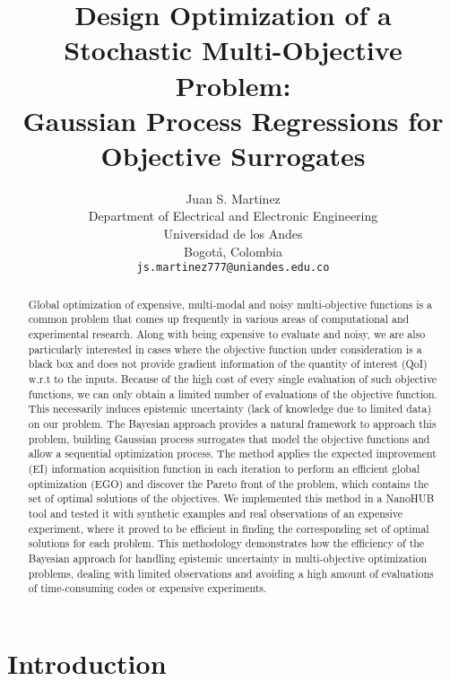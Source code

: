\documentclass{article}
\title{Design Optimization of a Stochastic Multi-Objective Problem: \\Gaussian Process Regressions for Objective Surrogates}
\author{
  Juan S. Martinez\\
  Department of Electrical and Electronic Engineering\\
  Universidad de los Andes\\
  Bogotá, Colombia \\
  \texttt{js.martinez777@uniandes.edu.co} \\
}
\begin{document}

\maketitle

\begin{abstract}
    Global optimization of expensive, multi-modal and noisy multi-objective functions is a common problem that comes up frequently in various areas of computational and experimental research. Along with being expensive to evaluate and noisy, we are also particularly interested in cases where the objective function under consideration is a black box and does not provide gradient information of the quantity of interest (QoI) w.r.t to the inputs. Because of the high cost of every single evaluation of such objective functions, we can only obtain a limited number of evaluations of the objective function. This necessarily induces epistemic uncertainty (lack of knowledge due to limited data) on our problem. The Bayesian approach provides a natural framework to approach this problem, building Gaussian process  surrogates that model the objective functions and allow a sequential optimization process. The method applies the expected improvement (EI) information acquisition function in each iteration to perform an efficient global optimization (EGO) and discover the Pareto front of the problem, which contains the set of optimal solutions of the objectives. We implemented this method in a NanoHUB tool and tested it with synthetic examples and real observations of an expensive experiment, where it proved to be efficient in finding the corresponding set of optimal solutions for each problem. This methodology demonstrates how the efficiency of the Bayesian approach for handling epistemic uncertainty in multi-objective optimization problems, dealing with limited observations and avoiding a high amount of evaluations of time-consuming codes or expensive experiments.
\end{abstract}

\section{Introduction}
\end{document}
